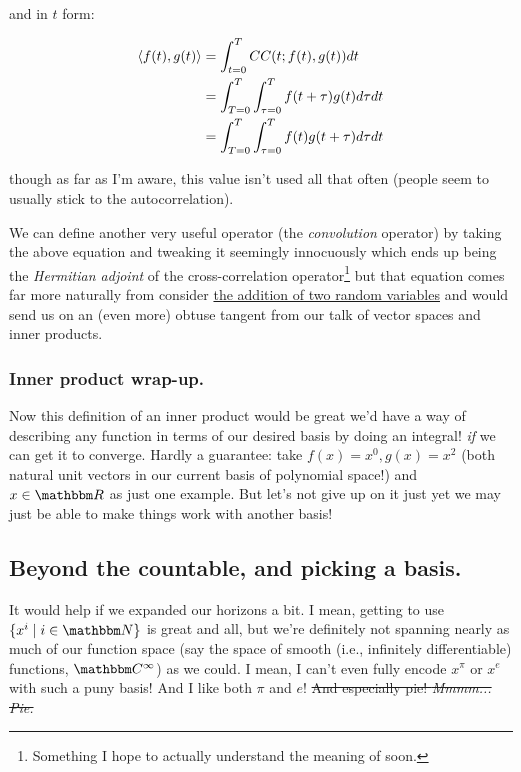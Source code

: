 \documentclass[../main/main.tex]{subfiles}
\begin{document}
and in \(t\) form:

\[ \begin{split}
  \left<f(t),g(t)\right> &= \int_{t=0}^{T} CC(t; f(t), g(t)) dt \\
  &= \int_{T = 0}^{T} \int_{\tau = 0}^{T} f(t + \tau) g(t) d\tau dt \\
  &= \int_{T = 0}^{T} \int_{\tau = 0}^{T} f(t) g(t + \tau) d\tau dt
\end{split}
\]

though as far as I'm aware, this value isn't used all that
often (people seem to usually stick to the autocorrelation). \par

We can define another very useful operator
(the \emph{convolution} operator)
by taking the above equation and tweaking it seemingly innocuously
\textemdash{} which ends up being the \emph{Hermitian adjoint}
of the cross-correlation operator\footnote{
  Something I hope to actually understand the meaning of soon.
} \textemdash{}
but that equation comes far more naturally from consider
\href{https://stats.stackexchange.com/a/332127}{the addition of two random variables}
and would send us on an (even more) obtuse tangent from our talk of
vector spaces and inner products. 

\subsubsection*{Inner product wrap-up.}

Now this definition of an inner product would be great 
\textemdash{}
we'd have a way of describing any function in terms of 
our desired basis by doing an integral!
\textemdash{}
\emph{if}
we can get it to converge.
Hardly a guarantee: take \(f(x) = x^0, g(x) = x^2\)
(both natural unit vectors in 
our current basis of polynomial space!)
and \(x \in \domain{R}\) as just one example.
But let's not give up on it just yet \textemdash{}
we may just be able to make things work with another basis!

\subsection{Beyond the countable, and picking a basis.}

It would help if
we expanded our horizons a bit.
I mean, getting to use \(\{x^i \mid i \in \domain{N}\}\)
is great and all, but we're definitely not spanning nearly
as much of our function space (say the space of smooth
(i.e., infinitely differentiable) functions, 
\(\domain{C}^\infty\)) as we could.
I mean, I can't even fully encode \(x^\pi\) or \(x^e\) 
with such a puny basis! And I like both \(\pi\) and \(e\)!
\sout{And especially pie! \textit{Mmmm... Pie.}}\par
\end{document}
